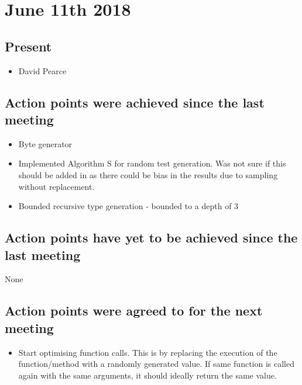 \documentclass[]{article}
\begin{document}
\section{June 11th 2018}
\subsection{Present}
\begin{itemize}
	\item David Pearce
\end{itemize}

\subsection{Action points were achieved since the last meeting}
\begin{itemize}
	\item Byte generator
	\item Implemented Algorithm S for random test generation. Was not sure if this should be added in as there could be bias in the results due to sampling without replacement.
	\item Bounded recursive type generation - bounded to a depth of 3
\end{itemize}
\subsection{Action points have yet to be achieved since the last meeting}
None
\subsection{Action points were agreed to for the next meeting}

\begin{itemize}
	\item Start optimising function calls. This is by replacing the execution of the function/method with a randomly generated value. If same function is called again with the same arguments, it should ideally return the same value.
\end{itemize}
\end{document}
